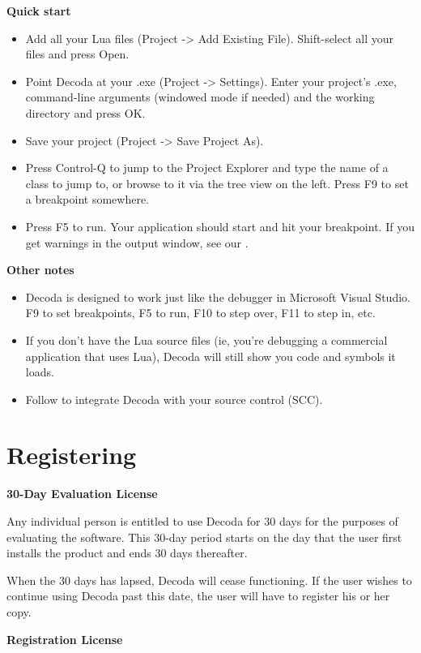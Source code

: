 \textbf{Quick start}
\begin{itemize}
\item Add all your Lua files (Project -> Add Existing File). Shift-select all your files and press Open.
\item Point Decoda at your .exe (Project -> Settings). Enter your project's .exe, command-line arguments (windowed mode if needed) and the working directory and press OK.
\item Save your project (Project -> Save Project As).
\item Press Control-Q to jump to the Project Explorer and type the name of a class to jump to, or browse to it via the tree view on the left. Press F9 to set a breakpoint somewhere.
\item Press F5 to run. Your application should start and hit your breakpoint. If you get warnings in the output window, see our .
\end{itemize}

\textbf{Other notes}
\begin{itemize}
\item Decoda is designed to work just like the debugger in Microsoft Visual Studio. F9 to set breakpoints, F5 to run, F10 to step over, F11 to step in, etc.  
\item If you don't have the Lua source files (ie, you're debugging a commercial application that uses Lua), Decoda will still show you code and symbols it loads.
\item Follow  to integrate Decoda with your source control (SCC).
\end{itemize}

\chapter{Registering}\label{registering}

\textbf{30-Day Evaluation License}

Any individual person is entitled to use Decoda for 30 days for the purposes of
evaluating the software. This 30-day period starts on the day that the user first
installs the product and ends 30 days thereafter.

When the 30 days has lapsed, Decoda will cease functioning. If the user wishes
to continue using Decoda past this date, the user will have to register his or her copy.

\textbf{Registration License}

